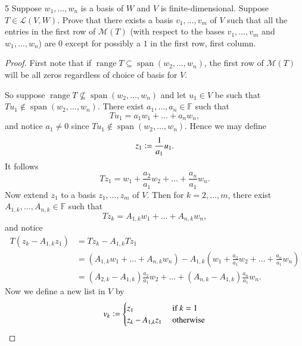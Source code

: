 \documentclass{extarticle}
\newenvironment{problem}[1]{\begin{prob*}{#1}{}}{\end{prob*}}
\newcommand{\F}{\mathbb{F}}
\newcommand{\mat}{\mathcal{M}}
\DeclareMathOperator{\Span}{span}
\newcommand{\Hom}{\mathcal{L}}
\DeclareMathOperator{\Range}{range}
\newcommand{\defeq}{\vcentcolon=}
\begin{document}
\begin{problem}{5}
Suppose $w_1,\dots, w_n$ is a basis of $W$ and $V$ is finite-dimensional.  Suppose $T\in\Hom(V,W)$.  Prove that there exists a basis $v_1,\dots, v_m$ of $V$ such that all the entries in the first row of $\mat(T)$ (with respect to the bases $v_1,\dots,v_m$ and $w_1,\dots,w_n$) are $0$ except for possibly a $1$ in the first row, first column.
\end{problem}
\begin{proof}
First note that if $\Range T\subseteq \Span(w_2,\dots,w_n)$, the first row of $\mat(T)$ will be all zeros regardless of choice of basis for $V$.  
\par So suppose $\Range T\not\subseteq \Span(w_2,\dots, w_n)$ and let $u_1\in V$ be such that $Tu_1\not\in\Span(w_2,\dots, w_n)$.  There exist $a_1,\dots, a_n\in\F$ such that 
\begin{equation*}
Tu_1=a_1w_1+\dots + a_nw_n,
\end{equation*}
and notice $a_1\neq 0$ since $Tu_1\not\in\Span(w_2,\dots,w_n)$.  Hence we may define
\begin{equation*}
z_1 \defeq \frac{1}{a_1}u_1.
\end{equation*} 
It follows
\begin{equation}\label{eq:1}
Tz_1 = w_1 + \frac{a_2}{a_1}w_2 + \dots + \frac{a_n}{a_1}w_n.
\end{equation}
Now extend $z_1$ to a basis $z_1,\dots, z_m$ of $V$.  Then for $k=2,\dots, m$, there exist $A_{1,k},\dots, A_{n,k}\in\F$ such that 
\begin{equation*}
Tz_k = A_{1,k}w_1 + \dots + A_{n,k}w_n,
\end{equation*}
and notice
\begin{align}
T(z_k - A_{1,k}z_1) &= Tz_k - A_{1,k}Tz_1 \nonumber \\
			       &= \left(A_{1,k}w_1 + \dots + A_{n,k}w_n\right) - A_{1,k}\left( w_1 + \frac{a_2}{a_1}w_2 + \dots + \frac{a_n}{a_1}w_n\right) \nonumber\\
			       &= \left(A_{2,k} - A_{1,k}\right)\frac{a_2}{a_1}w_2 + \dots + \left(A_{n,k} - A_{1,k}\right)\frac{a_n}{a_1}w_n.  \label{eq:2}
\end{align}
Now we define a new list in $V$ by
\begin{align*}
v_k \defeq \begin{cases}z_1 &\text{ if }k = 1\\ z_k - A_{1,k}z_1 &\text{ otherwise}\end{cases}
\end{align*}

\end{proof}
\end{document}
